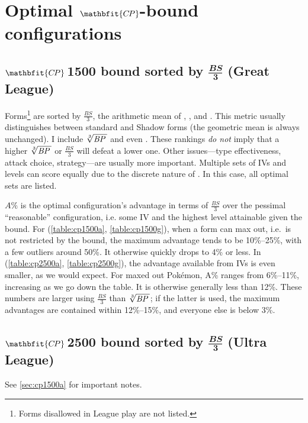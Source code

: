 \chapter{Optimal $\mathbfit{C\kern -1pt P}$-bound configurations\label{chap:optimal}}
\section[\CP1500 bound sorted by $\frac{\mathit{BS}}{3}$ (Great League)]%
{$\mathbfit{C\kern -1ptP}$\,1500 bound sorted by $\frac{\mathbfit{BS}}{\mathbf3}$ (Great League)\label{sec:cp1500a}}

Forms\footnote{Forms disallowed in League play are not listed.} are sorted by $\frac{\mathit{BS}}{3}$,
  the arithmetic mean of , , and \MHP\@.
This metric usually distinguishes between standard and Shadow forms (the geometric mean is always unchanged).
I include $\sqrt[3]{\mbox{$\mathit{BP}$}\,}$ and even \CP\@.
These rankings \textit{do not} imply that a higher $\sqrt[3]{\mbox{$\mathit{BP}$}\,}$ or $\frac{\mathit{BS}}{3}$
  will defeat a lower one.
Other issues---type effectiveness, attack choice, strategy---are usually more important.
Multiple sets of IVs and levels can score equally due to the discrete nature of \MHP\@.
In this case, all optimal sets are listed.

$A\%$ is the optimal configuration's advantage in terms of $\frac{BS}{3}$
  over the pessimal ``reasonable'' configuration, i.e. some IV
  and the highest level attainable given the \CP{} bound.
For  (\autoref{table:cp1500a}, \autoref{table:cp1500g}), when a form can max out, i.e.\ is not restricted by the \CP{} bound,
  the maximum advantage tends to be 10\%--25\%, with a few outliers around 50\%.
It otherwise quickly drops to 4\% or less.
In  (\autoref{table:cp2500a}, \autoref{table:cp2500g}), the advantage available from IVs is even smaller, as we would expect.
For maxed out Pokémon, A\% ranges from 6\%--11\%, increasing as we go down the table.
It is otherwise generally less than 12\%.
These numbers are larger using $\frac{\mathit{BS}}{3}$ than $\sqrt[3]{\mbox{$\mathit{BP}$}\,}$; if the latter is used,
  the maximum advantages are contained within 12\%--15\%, and everyone
  else is below 3\%.

\section[\CP2500 bound sorted by $\frac{\mathit{BS}}{3}$ (Ultra League)]%
{$\mathbfit{C\kern -1ptP}$\,2500 bound sorted by $\frac{\mathbfit{BS}}{\mathbf3}$ (Ultra League)}
See \autoref{sec:cp1500a} for important notes.

